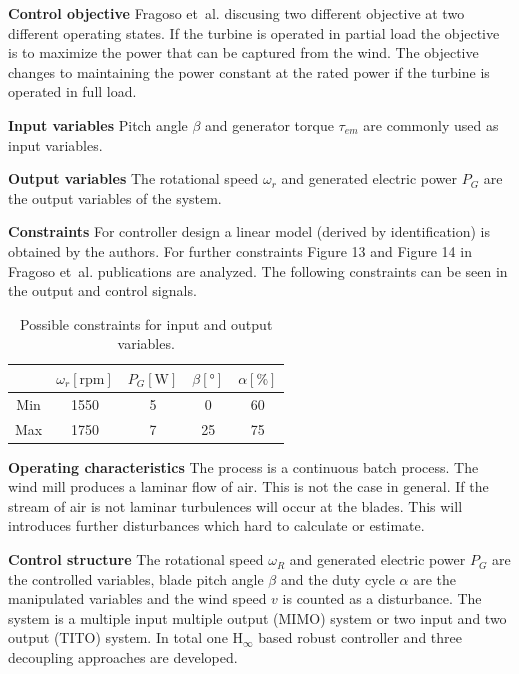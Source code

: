 \textbf{Control objective} Fragoso et~al. discusing two different objective at two different operating states.
If the turbine is operated in partial load the objective is to maximize the power that can be captured from the wind.
The objective changes to maintaining the power constant at the rated power if the turbine is operated in full load.

\textbf{Input variables} Pitch angle $\beta$ and generator torque $\tau_{em}$ are commonly used as input variables. 

\textbf{Output variables} The rotational speed $\omega_r$ and generated electric power $P_G$ are the output variables of the system.

\textbf{Constraints} For controller design a linear model (derived by identification) is obtained by the authors. 
For further constraints Figure 13 and Figure 14 in Fragoso et~al. publications are analyzed.
The following constraints can be seen in the output and control signals.

\begin{table}[H]
    \label{tab:constraints}
    \caption{Possible constraints for input and output variables.}
    \centering
    \begin{tabular}{ccccc} \toprule
            & $\omega_r \left[\text{rpm}\right]$ & $P_G \left[\si{\watt}\right]$ & $\beta \left[\si{\degree}\right]$ & $\alpha \left[\text{\%}\right]$ \\ \midrule
        Min & 1550 & 5 & 0  & 60 \\
        Max & 1750 & 7 & 25 & 75 \\ \bottomrule
    \end{tabular}
\end{table}


\textbf{Operating characteristics} The process is a continuous batch process.
The wind mill produces a laminar flow of air.
This is not the case in general.
If the stream of air is not laminar turbulences will occur at the blades.
This will introduces further disturbances which hard to calculate or estimate.

\textbf{Control structure}
The rotational speed $\omega_R$ and generated electric power $P_G$ are the controlled variables, blade pitch angle $\beta$ and the duty cycle $\alpha$ are the manipulated variables and the wind speed $v$ is counted as a disturbance.
The system is a multiple input multiple output (MIMO) system or two input and two output (TITO) system.
In total one $\text{H}_{\infty}$ based robust controller and three decoupling approaches are developed. 

